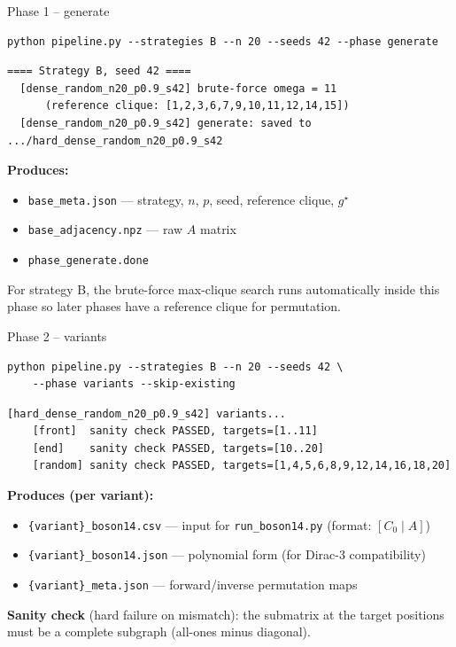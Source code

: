\documentclass[aspectratio=169]{beamer}
\begin{document}
\begin{frame}[fragile]{Phase 1 -- generate}
\begin{lstlisting}[style=shell,numbers=none]
python pipeline.py --strategies B --n 20 --seeds 42 --phase generate
\end{lstlisting}

\begin{lstlisting}[numbers=none,basicstyle=\ttfamily\scriptsize]
==== Strategy B, seed 42 ====
  [dense_random_n20_p0.9_s42] brute-force omega = 11
      (reference clique: [1,2,3,6,7,9,10,11,12,14,15])
  [dense_random_n20_p0.9_s42] generate: saved to .../hard_dense_random_n20_p0.9_s42
\end{lstlisting}

    \textbf{Produces:}
    \begin{itemize}
        \item \texttt{base\_meta.json} --- strategy, $n$, $p$, seed, reference clique, $g^\star$
        \item \texttt{base\_adjacency.npz} --- raw $A$ matrix
        \item \texttt{phase\_generate.done}
    \end{itemize}

    For strategy B, the brute-force max-clique search runs automatically inside this phase so later phases have a reference clique for permutation.
\end{frame}


\begin{frame}[fragile]{Phase 2 -- variants}
\begin{lstlisting}[style=shell,numbers=none]
python pipeline.py --strategies B --n 20 --seeds 42 \
    --phase variants --skip-existing
\end{lstlisting}

\begin{lstlisting}[numbers=none,basicstyle=\ttfamily\scriptsize]
[hard_dense_random_n20_p0.9_s42] variants...
    [front]  sanity check PASSED, targets=[1..11]
    [end]    sanity check PASSED, targets=[10..20]
    [random] sanity check PASSED, targets=[1,4,5,6,8,9,12,14,16,18,20]
\end{lstlisting}

    \textbf{Produces (per variant):}
    \begin{itemize}
        \item \texttt{\{variant\}\_boson14.csv} --- input for \texttt{run\_boson14.py} (format: $[C_0\mid A]$)
        \item \texttt{\{variant\}\_boson14.json} --- polynomial form (for Dirac-3 compatibility)
        \item \texttt{\{variant\}\_meta.json} --- forward/inverse permutation maps
    \end{itemize}

    \textbf{Sanity check} (hard failure on mismatch): the submatrix at the target positions must be a complete subgraph (all-ones minus diagonal).
\end{frame}
\end{document}
